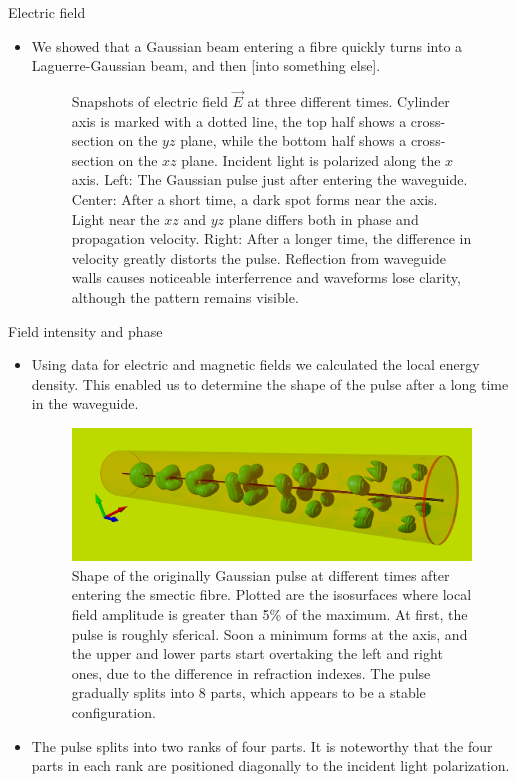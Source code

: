\documentclass{beamer}
\newlength{\wideitemsep}
\let\olditem\item
\renewcommand{\item}{\setlength{\itemsep}{\wideitemsep}\olditem}
\newcommand{\blockpadding}{
  \rule[-0.6ex]{0pt}{2.5ex}
}
\begin{document}
\begin{columns}[t]
 \begin{column}{0.596\textwidth}
  \begin{block}{\blockpadding Electric field}
  \begin{itemize}
   \item We showed that a Gaussian beam entering a fibre quickly turns into a Laguerre-Gaussian beam, and then [into something else]. 
\begin{figure}[h]
\centering
 \caption{Snapshots of electric field $\vec E$ at three different times. Cylinder axis is marked with a dotted line, the top half shows a cross-section on the $yz$ plane, while the bottom half shows a cross-section on the $xz$ plane. Incident light is polarized along the $x$ axis. {\color{dark} Left:} The Gaussian pulse just after entering the waveguide. {\color{dark} Center:} After a short time, a dark spot forms near the axis. Light near the $xz$ and $yz$ plane differs both in phase and propagation velocity. {\color{dark} Right:} After a longer time, the difference in velocity greatly distorts the pulse. Reflection from waveguide walls causes noticeable interferrence and waveforms lose clarity, although the pattern remains visible. }
\end{figure}
\end{itemize}

\end{block}
\begin{block}{\blockpadding Field intensity and phase}
\begin{itemize}
 \item Using data for electric and magnetic fields we calculated the local energy density. This enabled us to determine the shape of the pulse after a long time in the waveguide. 
 \begin{figure}[h]
  \centering
  \includegraphics[width=.825\textwidth]{./Povray/intensity_gauss}
  \caption{Shape of the originally Gaussian pulse at different times after entering the smectic fibre. Plotted are the isosurfaces where local field amplitude is greater than 5\% of the maximum. At first, the pulse is roughly sferical. Soon a minimum forms at the axis, and the upper and lower parts start overtaking the left and right ones, due to the difference in refraction indexes. The pulse gradually splits into 8 parts, which appears to be a stable configuration. }
 \end{figure}
 \item The pulse splits into two ranks of four parts. It is noteworthy that the four parts in each rank are positioned diagonally to the incident light polarization. 


\end{itemize}
\end{block}
\end{column}
\end{columns}
\end{document}
